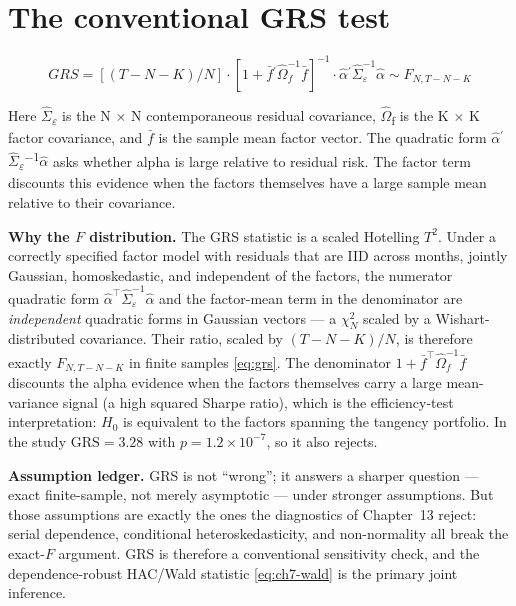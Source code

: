 \hypertarget{the-conventional-grs-test}{%
\section{The conventional GRS test}\label{the-conventional-grs-test}}

\begin{equation}
GRS = [(T-N-K)/N] \cdot  [1 + \bar{f}{}^{\prime}\hat{\Omega }_{f}^{-1}\bar{f}]^{-1} \cdot  \hat{\alpha }{}^{\prime}\hat{\Sigma}_{\varepsilon}^{-1}\hat{\alpha } \sim F_{N,T-N-K}
\end{equation}

Here \ensuremath{\hat{\Sigma }}\textsubscript{\ensuremath{\varepsilon }} is the N \ensuremath{\times } N contemporaneous residual
covariance, \ensuremath{\hat{\Omega }}\textsubscript{f} is the K \ensuremath{\times } K factor covariance, and \ensuremath{\bar{f}} is
the sample mean factor vector. The quadratic form
\ensuremath{\hat{\alpha }}\ensuremath{{}^{\prime}}\ensuremath{\hat{\Sigma }}\textsubscript{\ensuremath{\varepsilon }}\textsuperscript{\ensuremath{-}1}\ensuremath{\hat{\alpha }} asks whether alpha is large
relative to residual risk. The factor term discounts this evidence when
the factors themselves have a large sample mean relative to their
covariance.

\textbf{Why the $F$ distribution.} The GRS statistic is a scaled Hotelling
$T^2$. Under a correctly specified factor model with residuals that are IID
across months, jointly Gaussian, homoskedastic, and independent of the
factors, the numerator quadratic form
$\hat\alpha^{\top}\hat\Sigma_\varepsilon^{-1}\hat\alpha$ and the factor-mean
term in the denominator are \emph{independent} quadratic forms in Gaussian
vectors --- a $\chi^2_N$ scaled by a Wishart-distributed covariance. Their
ratio, scaled by $(T-N-K)/N$, is therefore exactly $F_{N,T-N-K}$ in finite
samples \eqref{eq:grs}. The denominator $1+\bar f^{\top}\hat\Omega_f^{-1}\bar f$
discounts the alpha evidence when the factors themselves carry a large
mean-variance signal (a high squared Sharpe ratio), which is the
efficiency-test interpretation: $H_0$ is equivalent to the factors spanning
the tangency portfolio. In the study $\mathrm{GRS}=3.28$ with
$p=1.2\times10^{-7}$, so it also rejects.

\textbf{Assumption ledger.} GRS is not ``wrong''; it answers a sharper
question --- exact finite-sample, not merely asymptotic --- under stronger
assumptions. But those assumptions are exactly the ones the diagnostics of
Chapter~13 reject: serial dependence, conditional heteroskedasticity, and
non-normality all break the exact-$F$ argument. GRS is therefore a
conventional sensitivity check, and the dependence-robust HAC/Wald statistic
\eqref{eq:ch7-wald} is the primary joint inference.

